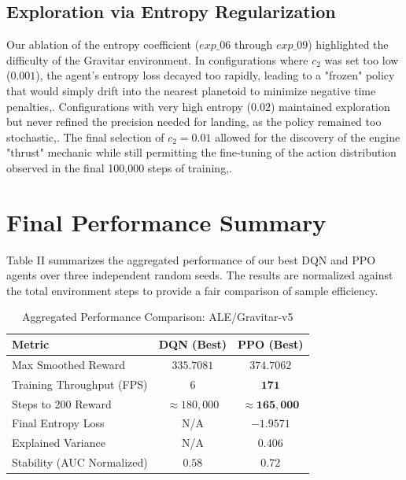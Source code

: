 \documentclass[conference]{IEEEtran}
\begin{document}
\subsection{Exploration via Entropy Regularization}
Our ablation of the entropy coefficient ($exp\_06$ through $exp\_09$) highlighted the difficulty of the Gravitar environment.
In configurations where $c_2$ was set too low ($0.001$), the agent's entropy loss decayed too rapidly, leading to a "frozen" policy that would simply drift into the nearest planetoid to minimize negative time penalties,.
Configurations with very high entropy ($0.02$) maintained exploration but never refined the precision needed for landing, as the policy remained too stochastic,.
The final selection of $c_2 = 0.01$ allowed for the discovery of the engine "thrust" mechanic while still permitting the fine-tuning of the action distribution observed in the final 100,000 steps of training,.

\section{Final Performance Summary}
Table II summarizes the aggregated performance of our best DQN and PPO agents over three independent random seeds.
The results are normalized against the total environment steps to provide a fair comparison of sample efficiency.

\begin{table}[htbp]
\caption{Aggregated Performance Comparison: ALE/Gravitar-v5}
\begin{center}
\begin{tabular}{|l|c|c|}
\hline
\textbf{Metric} & \textbf{DQN (Best)} & \textbf{PPO (Best)} \\
\hline
Max Smoothed Reward & $335.7081$ & $\mathbf{374.7062}$ \\
\hline
Training Throughput (FPS) & $6$ & $\mathbf{171}$ \\
\hline
Steps to 200 Reward & $\approx 180,000$ & $\approx \mathbf{165,000}$ \\
\hline
Final Entropy Loss & N/A & $-1.9571$ \\
\hline
Explained Variance & N/A & $0.406$ \\
\hline
Stability (AUC Normalized) & $0.58$ & $\mathbf{0.72}$ \\
\hline
\end{tabular}
\label{tab_final}
\end{center}
\end{table}
\end{document}
